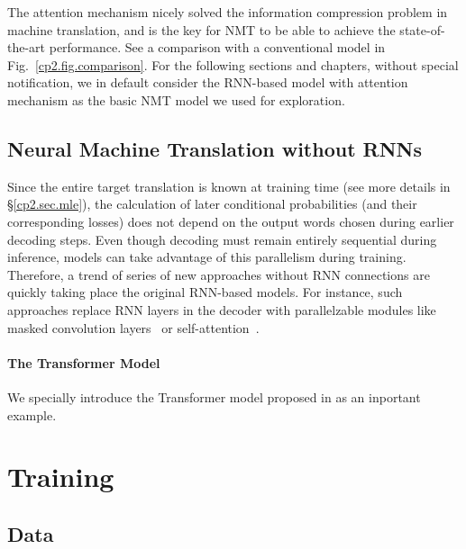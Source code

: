 The attention mechanism nicely solved the information compression problem in machine translation, and is the key for NMT to be able to achieve the state-of-the-art performance. See a comparison with a conventional \sts model in Fig.~\ref{cp2.fig.comparison}. For the following sections and chapters, without special notification, we in default consider the RNN-based \sts model with attention mechanism as the basic NMT model we used for exploration. 

\subsection{Neural Machine Translation without RNNs}
Since the entire target translation is known at training time (see more details in \S\ref{cp2.sec.mle}), the calculation of later conditional probabilities (and their corresponding losses) does not depend on the output words chosen during earlier decoding steps. 
Even though decoding must remain entirely sequential during inference, models can take advantage of this parallelism during training. Therefore, a trend of series of new approaches without RNN connections are quickly taking place the original RNN-based models.
For instance, such approaches replace RNN layers in the decoder with parallelzable modules like  masked convolution layers~\cite{kalchbrenner2016neural, gehring2017convolutional} or self-attention~\cite{vaswani2017attention}. %

\paragraph{The Transformer Model}
We specially introduce the Transformer model proposed in  as an inportant example. 

\section{Training}
\subsection{Data}
